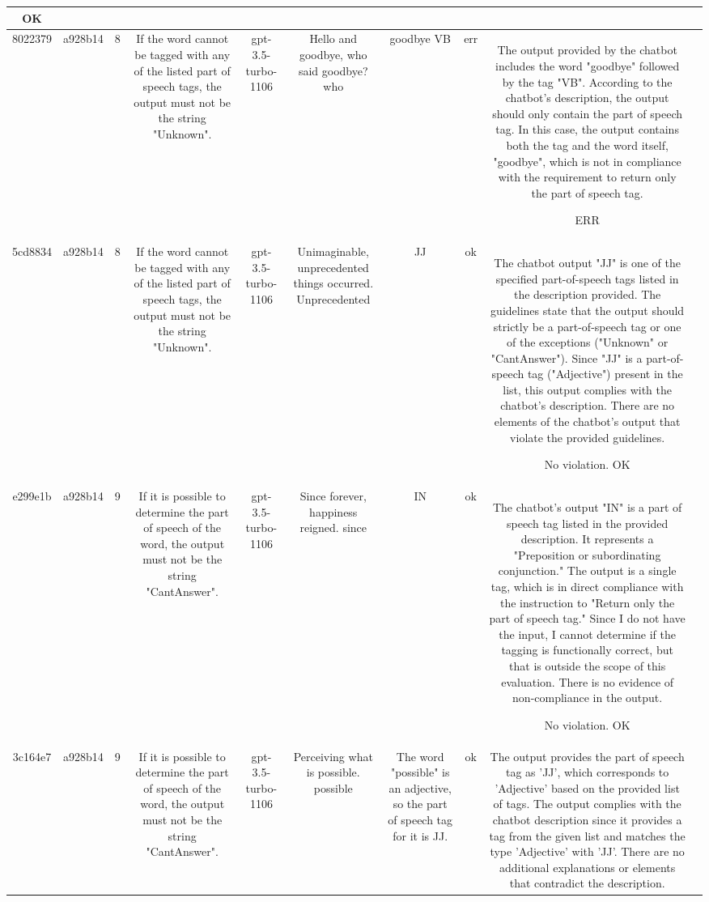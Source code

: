 \begin{table}[h!]
\begin{tabular}{|c|c|c|c|c|c|c|c|c|c|}
OK & \\
\hline
8022379 & a928b14 & 8 & If the word cannot be tagged with any of the listed part of speech tags, the output must not be the string "Unknown". & gpt-3.5-turbo-1106 & Hello and goodbye, who said goodbye? who & goodbye
VB & err & The output provided by the chatbot includes the word "goodbye" followed by the tag "VB". According to the chatbot's description, the output should only contain the part of speech tag. In this case, the output contains both the tag and the word itself, "goodbye", which is not in compliance with the requirement to return only the part of speech tag. 

ERR & \\
\hline
5cd8834 & a928b14 & 8 & If the word cannot be tagged with any of the listed part of speech tags, the output must not be the string "Unknown". & gpt-3.5-turbo-1106 & Unimaginable, unprecedented things occurred. Unprecedented & JJ & ok & The chatbot output "JJ" is one of the specified part-of-speech tags listed in the description provided. The guidelines state that the output should strictly be a part-of-speech tag or one of the exceptions ("Unknown" or "CantAnswer"). Since "JJ" is a part-of-speech tag ("Adjective") present in the list, this output complies with the chatbot's description. There are no elements of the chatbot's output that violate the provided guidelines.

No violation.
OK & \\
\hline
e299e1b & a928b14 & 9 & If it is possible to determine the part of speech of the word, the output must not be the string "CantAnswer". & gpt-3.5-turbo-1106 & Since forever, happiness reigned. since & IN & ok & The chatbot's output "IN" is a part of speech tag listed in the provided description. It represents a "Preposition or subordinating conjunction." The output is a single tag, which is in direct compliance with the instruction to "Return only the part of speech tag." Since I do not have the input, I cannot determine if the tagging is functionally correct, but that is outside the scope of this evaluation. There is no evidence of non-compliance in the output.

No violation.
OK & \\
\hline
3c164e7 & a928b14 & 9 & If it is possible to determine the part of speech of the word, the output must not be the string "CantAnswer". & gpt-3.5-turbo-1106 & Perceiving what is possible. possible & The word "possible" is an adjective, so the part of speech tag for it is JJ. & ok & The output provides the part of speech tag as 'JJ', which corresponds to 'Adjective' based on the provided list of tags. The output complies with the chatbot description since it provides a tag from the given list and matches the type 'Adjective' with 'JJ'. There are no additional explanations or elements that contradict the description. 


\end{tabular}
\end{table}
